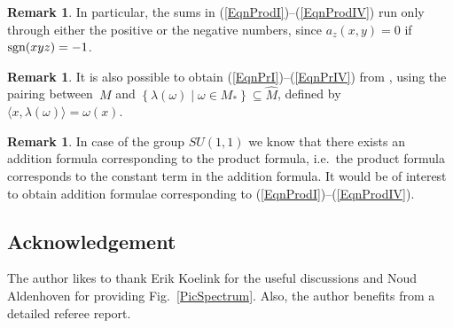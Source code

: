 \documentclass[pdftex]{sigma}
\numberwithin{equation}{section}
\theoremstyle{definition}
\newtheorem{rmk}[thm]{Remark}
\newcommand{\sgn}{\text{\rm sgn}}
\begin{document}
\begin{rmk}
In particular, the sums in (\ref{EqnProdI})--(\ref{EqnProdIV}) run only through either the positive or the negative numbers, since $a_z(x,y) = 0$ if $\sgn(xyz) = -1$.
\end{rmk}

\begin{rmk}
It is also possible to obtain (\ref{EqnPrI})--(\ref{EqnPrIV}) from \cite[Proposition~4.10]{GroKoeKus}, using the pairing between~$M$ and $\left\{ \lambda(\omega) \mid \omega \in M_\ast \right\} \subseteq \hat{M}$, def\/ined by $\langle x, \lambda(\omega) \rangle = \omega(x)$.
 \end{rmk}

\begin{rmk}
In case of the group $SU(1,1)$ we know \cite[Chapter~6]{VilKli} that there exists an addition formula corresponding to the product formula, i.e.\ the product formula corresponds to the constant term in the addition formula. It would be of interest to obtain addition formulae corresponding to (\ref{EqnProdI})--(\ref{EqnProdIV}).
\end{rmk}



\subsection*{Acknowledgement}
The author likes to thank Erik Koelink for the useful discussions and Noud Aldenhoven for providing Fig.~\ref{PicSpectrum}. Also, the author benef\/its from a detailed referee report.

\newpage
\end{document}
